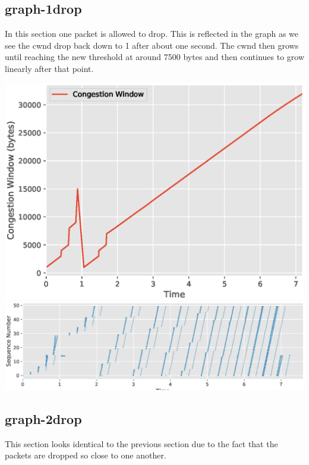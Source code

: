 \documentclass[a4paper,11pt]{article}
\begin{document}
\pagebreak

\subsection{graph-1drop}
In this section one packet is allowed to drop. This is reflected in the graph as we see the cwnd drop back down to 1 after about one second. The cwnd then grows until reaching the new threshold at around 7500 bytes and then continues to grow linearly after that point. 

\begin{center}
\includegraphics[width=\linewidth]{graphs-1drop/cwnd}
\includegraphics[width=\linewidth]{graphs-1drop/sequence}
\end{center}

\pagebreak

\subsection{graph-2drop}
This section looks identical to the previous section due to the fact that the packets are dropped so close to one another. 
\end{document}
